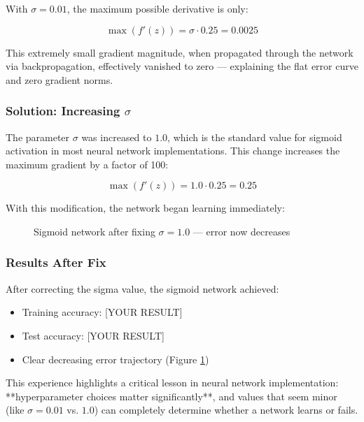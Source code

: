 With \(\sigma = 0.01\), the maximum possible derivative is only:

\begin{equation}
\max(f'(z)) = \sigma \cdot 0.25 = 0.0025
\end{equation}

This extremely small gradient magnitude, when propagated through the network via backpropagation, effectively vanished to zero — explaining the flat error curve and zero gradient norms.

\subsubsection{Solution: Increasing \(\sigma\)}

The parameter \(\sigma\) was increased to \(1.0\), which is the standard value for sigmoid activation in most neural network implementations. This change increases the maximum gradient by a factor of 100:

\begin{equation}
\max(f'(z)) = 1.0 \cdot 0.25 = 0.25
\end{equation}

With this modification, the network began learning immediately:

\begin{figure}[h]
\centering
\caption{Sigmoid network after fixing \(\sigma = 1.0\) — error now decreases}
\label{fig:sigmoid_fixed}
\end{figure}

\subsubsection{Results After Fix}

After correcting the sigma value, the sigmoid network achieved:

\begin{itemize}
    \item Training accuracy: [YOUR RESULT]%
    \item Test accuracy: [YOUR RESULT]%
    \item Clear decreasing error trajectory (Figure \ref{fig:sigmoid_fixed})
\end{itemize}

This experience highlights a critical lesson in neural network implementation: **hyperparameter choices matter significantly**, and values that seem minor (like \(\sigma = 0.01\) vs. \(1.0\)) can completely determine whether a network learns or fails.